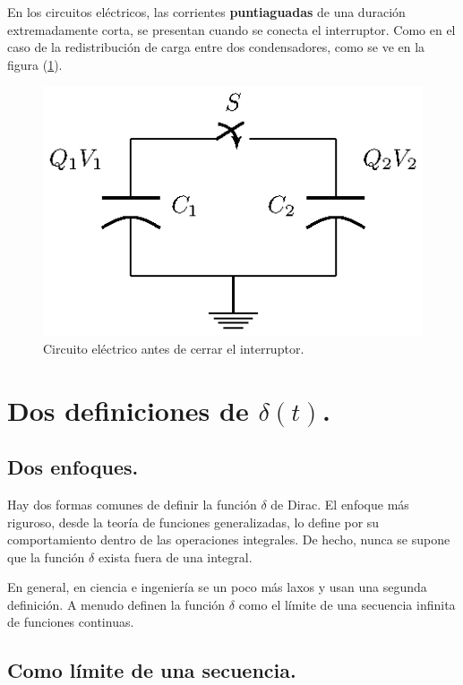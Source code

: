 \documentclass[12pt]{article}
\numberwithin{equation}{section}
\begin{document}
En los circuitos eléctricos, las corrientes \textbf{puntiaguadas} de una duración extremadamente corta, se presentan cuando se conecta el interruptor. Como en el caso de la redistribución de carga entre dos condensadores, como se ve en la figura (\ref{fig:figura_delta_Dirac_03}).
\begin{figure}[H]
    \centering
    \includegraphics[scale=1.25]{Imagenes/delta_Dirac_03.eps}
    \caption{Circuito eléctrico antes de cerrar el interruptor.}
    \label{fig:figura_delta_Dirac_03}
\end{figure}


\section{Dos definiciones de \texorpdfstring{$\delta (t)$}{d(t)}.}
\subsection{Dos enfoques.}

Hay dos formas comunes de definir la función $\delta$ de Dirac. El enfoque más riguroso, desde la teoría de funciones generalizadas, lo define por su comportamiento dentro de las operaciones integrales. De hecho, nunca se supone que la función $\delta$ exista fuera de una integral.
\par
En general, en ciencia e ingeniería se un poco más laxos y usan una segunda definición. A menudo definen la función $\delta$ como el límite de una secuencia infinita de funciones continuas.

\subsection{Como límite de una secuencia.}
\end{document}
